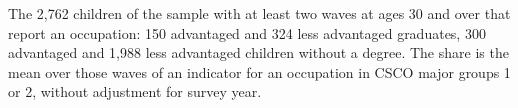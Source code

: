 The 2,762 children of the sample with at least two waves at ages 30 and over that report an occupation: 150 advantaged and 324 less advantaged graduates, 300 advantaged and 1,988 less advantaged children without a degree. The share is the mean over those waves of an indicator for an occupation in CSCO major groups 1 or 2, without adjustment for survey year.%
